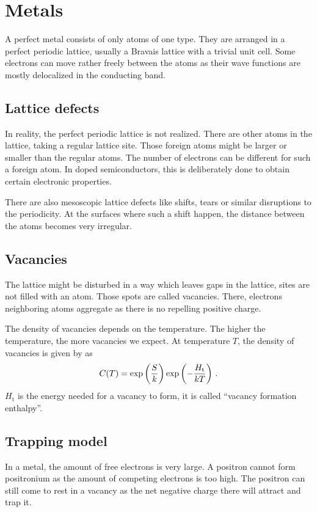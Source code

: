 \documentclass[11pt, english, fleqn, DIV=15, headinclude, BCOR=2cm]{scrreprt}
\begin{document}
\section{Metals}

A perfect metal consists of only atoms of one type. They are arranged in a
perfect periodic lattice, usually a Bravais lattice with a trivial unit cell.
Some electrons can move rather freely between the atoms as their wave functions
are mostly delocalized in the conducting band.

\subsection{Lattice defects}

In reality, the perfect periodic lattice is not realized. There are other atoms
in the lattice, taking a regular lattice site. Those foreign atoms might be
larger or smaller than the regular atoms. The number of electrons can be
different for such a foreign atom. In doped semiconductors, this is
deliberately done to obtain certain electronic properties.

There are also mesoscopic lattice defects like shifts, tears or similar
disruptions to the periodicity. At the surfaces where such a shift happen,
the distance between the atoms becomes very irregular.

\subsection{Vacancies}

The lattice might be disturbed in a way which leaves gaps in the lattice, sites
are not filled with an atom. Those spots are called vacancies. There, electrons
neighboring atoms aggregate as there is no repelling positive charge.

The density of vacancies depends on the temperature. The higher the
temperature, the more vacancies we expect. At temperature $T$, the density of
vacancies is given by \textcite[(3)]{Weiler/Vacancy_formation} as
\[
    C(T) = \exp\left( \frac{S}{k} \right) \exp\left( -\frac{H_\mathrm t}{kT} \right) \,.
\]
$H_\mathrm t$ is the energy needed for a vacancy to form, it is called
\enquote{vacancy formation enthalpy}.

\subsection{Trapping model}
\label{ssec:tra_mod}

In a metal, the amount of free electrons is very large. A positron cannot form
positronium as the amount of competing electrons is too high. The positron can
still come to rest in a vacancy as the net negative charge there will attract
and trap it.
\end{document}
